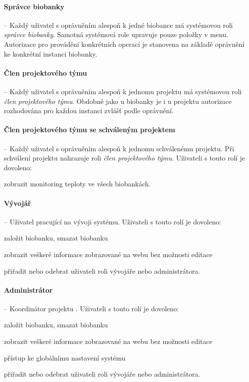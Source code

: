 \paragraph*{Správce biobanky} -- Každý uživatel s oprávněním alespoň k jedné biobance má systémovou roli \textit{správce biobanky}. Samotná systémová role upravuje pouze položky v menu. Autorizace pro provádění konkrétních operací je stanovena na základě oprávnění ke konkrétní instanci biobanky. 

\paragraph*{Člen projektového týmu} -- Každý uživatel s oprávněním alespoň k jednomu projektu má systémovou roli \textit{člen projektového týmu}. Obdobně jako u biobanky je i u projektu autorizace rozhodována pro každou instanci zvlášť podle oprávnění.

\paragraph*{Člen projektového týmu se schváleným projektem} -- Každý uživatel s oprávněním alespoň k jednomu schválenému projektu. Při schválení projektu nahrazuje roli \textit{člen projektového týmu}.
Uživateli s touto rolí je dovoleno:
\begin{compactitem}
	\item zobrazit monitoring teploty ve všech biobankách.
\end{compactitem}

\paragraph*{Vývojář} -- Uživatel pracující na vývoji systému. 
Uživateli s touto rolí je dovoleno:
\begin{compactitem}
	\item založit biobanku, smazat biobanku
	\item zobrazit veškeré informace zobrazované na webu bez možnosti editace
	\item přiřadit nebo odebrat uživateli roli vývojáře nebo administrátora.
\end{compactitem}

\paragraph*{Administrátor} -- Koordinátor projektu \ProjectName.
Uživateli s touto rolí je dovoleno:
\begin{compactitem}
	\item založit biobanku, smazat biobanku
	\item zobrazit veškeré informace zobrazované na webu bez možnosti editace
	\item přístup ke globálnímu nastavení systému
	\item přiřadit nebo odebrat uživateli roli vývojáře nebo administrátora.
\end{compactitem}


